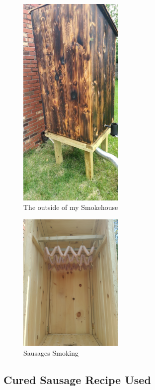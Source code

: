 \documentclass[letterpaper,11pt,leqno]{article}
\begin{document}
 \begin{figure}[!htb]
	\centering
	\includegraphics[width=0.45\textwidth]{Figures/Messenger_creation_8ca9e75e-8d85-4b6f-bd27-b4976f07179f.png}
	\caption{The outside of my Smokehouse}
	\label{Smoker}
\end{figure}
\begin{figure}[!htb]
	\centering
	\includegraphics[width=0.45\textwidth]{Figures/2024-04-26-11-13-05-315.jpg}
	\caption{Sausages Smoking}
	\label{SmokingSausage}
\end{figure}

\FloatBarrier

\subsection{Cured Sausage Recipe Used}
\end{document}
